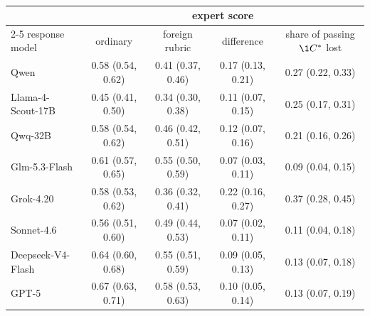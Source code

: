 \begin{table}[h]
\centering
\small
\begin{tabular}{lcccc}
\toprule
 & \multicolumn{4}{c}{expert score} \\
\cmidrule(lr){2-5}
response model & ordinary & foreign rubric & difference & share of passing $\1C^*$ lost \\
\midrule
Qwen & 0.58 (0.54, 0.62) & 0.41 (0.37, 0.46) & 0.17 (0.13, 0.21) & 0.27 (0.22, 0.33) \\
Llama-4-Scout-17B & 0.45 (0.41, 0.50) & 0.34 (0.30, 0.38) & 0.11 (0.07, 0.15) & 0.25 (0.17, 0.31) \\
Qwq-32B & 0.58 (0.54, 0.62) & 0.46 (0.42, 0.51) & 0.12 (0.07, 0.16) & 0.21 (0.16, 0.26) \\
Glm-5.3-Flash & 0.61 (0.57, 0.65) & 0.55 (0.50, 0.59) & 0.07 (0.03, 0.11) & 0.09 (0.04, 0.15) \\
Grok-4.20 & 0.58 (0.53, 0.62) & 0.36 (0.32, 0.41) & 0.22 (0.16, 0.27) & 0.37 (0.28, 0.45) \\
Sonnet-4.6 & 0.56 (0.51, 0.60) & 0.49 (0.44, 0.53) & 0.07 (0.02, 0.11) & 0.11 (0.04, 0.18) \\
Deepseek-V4-Flash & 0.64 (0.60, 0.68) & 0.55 (0.51, 0.59) & 0.09 (0.05, 0.13) & 0.13 (0.07, 0.18) \\
GPT-5 & 0.67 (0.63, 0.71) & 0.58 (0.53, 0.63) & 0.10 (0.05, 0.14) & 0.13 (0.07, 0.19) \\
\bottomrule
\end{tabular}
\caption{}
\label{tab:foreign_rubric}
\end{table}

